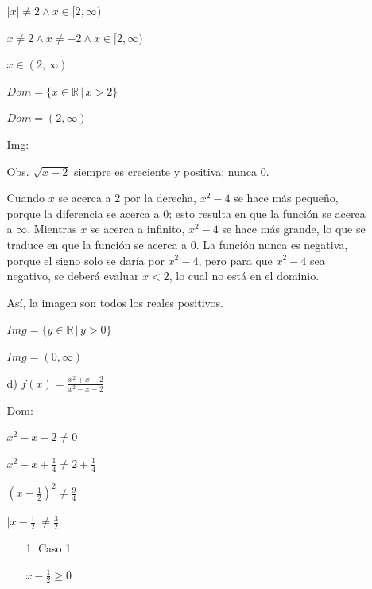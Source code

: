 \documentclass{article}
\begin{document}
\begin{enumerate}
\begin{enumerate}
        $\lvert x \rvert \neq 2 \land x \in [2, \infty)$

        $x \neq 2 \land x \neq -2 \land x \in [2, \infty)$

        $x \in (2, \infty)$
        \vspace{\baselineskip}

        $Dom = \{x \in \mathbb{R} \, | \, x > 2\}$

        $Dom = (2, \infty)$
        \vspace{\baselineskip}
        
        Img:
        
        Obs. $\sqrt{x-2}$ siempre es creciente y positiva; nunca 0.
        \vspace{\baselineskip}
        
        Cuando $x$ se acerca a 2 por la derecha, $x^2 - 4$ se hace más pequeño, porque la diferencia se acerca a 0; esto resulta en que la función se acerca a $\infty$. Mientras $x$ se acerca a infinito, $x^2 - 4$ se hace más grande, lo que se traduce en que la función se acerca a 0. La función nunca es negativa, porque el signo solo se daría por $x^2 - 4$, pero para que $x^2 - 4$ sea negativo, se deberá evaluar $x < 2$, lo cual no está en el dominio.
        \vspace{\baselineskip}
        
        Así, la imagen son todos los reales positivos.

        $Img = \{y \in \mathbb{R} \, | \, y > 0\}$

        $Img = (0, \infty)$
        \vspace{\baselineskip}
        \item[d)]\(f(x) = \frac{x^2 + x - 2}{x^2 - x - 2}\)

        Dom:

        $x^2 - x - 2 \neq 0$

        $x^2 - x + \frac{1}{4} \neq 2 + \frac{1}{4}$

        $(x - \frac{1}{2})^2 \neq \frac{9}{4}$

        $\lvert x - \frac{1}{2} \rvert \neq \frac{3}{2}$
        \vspace{\baselineskip}

        \begin{multicols}{2}
         \begin{enumerate}
         \item[1.] Caso 1
         
         $x - \frac{1}{2} \geq 0$


\end{enumerate}
\end{multicols}
\end{enumerate}
\end{enumerate}
\end{document}
